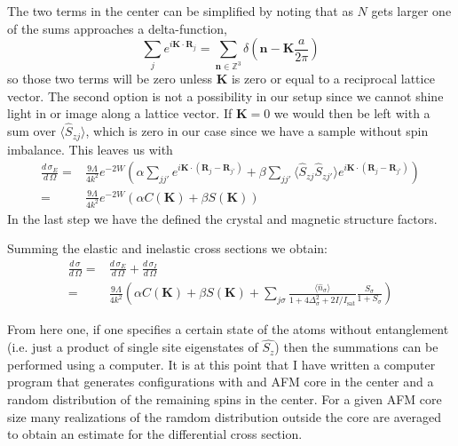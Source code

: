 \documentclass[11pt,letter]{article}
\newcommand{\bv}[1]{\ensuremath{\bm{#1}}}
\newcommand{\dsig}[1]{\ensuremath{ \frac{ d\,\sigma_{#1} }{d\,\Omega} }}
\begin{document}
The two terms in the center can be simplified by noting that as $N$ gets larger one of the sums approaches a delta-function,  
\begin{equation}
\sum_{j} e^{i \bv{K} \cdot \bv{R}_{j} }  =  \sum_{\bv{n} \in \mathbb{Z}^{3} } \delta \left( \bv{n} - \bv{K}\frac{a}{2\pi} \right) 
\end{equation}
so those two terms will be zero unless $\bv{K}$ is zero or equal to a
reciprocal lattice vector.   The second option is not a possibility in our setup since
we cannot shine light in or image along a lattice vector.  If $\bv{K}=0$ we
would then be left with a sum over $\langle\hat{S}_{zj}\rangle$, which is zero
in our case since we have a sample without spin imbalance.   This leaves us with
\begin{equation}
\begin{split}
\dsig{E} =&  
             \frac{9\Lambda}{4k^{2}} e^{-2W} \left(
               \alpha \sum_{ j j' }      e^{i\bv{K}\cdot(\bv{R}_{j}-\bv{R}_{j'})}
	    +  \beta \sum_{j j'} \langle \hat{S}_{zj} \hat{S}_{zj'} \rangle
            e^{i\bv{K}\cdot(\bv{R}_{j}-\bv{R}_{j'})}  \right) \\
         =&
             \frac{9\Lambda}{4k^{2}} e^{-2W} 
             \left(
               \alpha C(\bv{K})  
	    +  \beta S(\bv{K})  \right)
\end{split} 
\end{equation}
In the last step we have the defined the crystal and magnetic structure factors. 

Summing the elastic and inelastic cross sections we obtain:
\begin{equation}
\begin{split} 
\dsig{} = & \dsig{E} + \dsig{I}  \\
        = &\frac{9\Lambda}{4k^{2}} 
          \left(
               \alpha C(\bv{K})  
	    +  \beta S(\bv{K}) 
            +  \sum_{j\sigma}
                     \frac{\langle \hat{n}_{\sigma} \rangle}{1+ 4\Delta_{\sigma}^{2} + 2 I / I_{\mathrm{sat}} } 
            \frac{S_{\sigma}}{  1+S_{\sigma} }
          \right)
\end{split}
\end{equation}

From here one, if one specifies a certain state of the atoms without entanglement (i.e. just a product of single site eigenstates of $\hat{S_{z}}$)  then the summations can be performed using a computer.   It is at this point that I have written a computer program that generates configurations with and AFM core in the center and a random distribution of the remaining spins in the center.   For a given AFM core size many realizations of the ramdom distribution outside the core are averaged to obtain an estimate for the differential cross section. 
 
\end{document}
